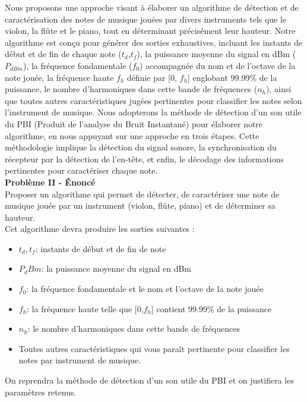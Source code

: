Nous proposons une approche visant à élaborer un algorithme de détection et de caractérisation des notes de musique jouées par divers instruments tels que le violon, la flûte et le piano, tout en déterminant précisément leur hauteur. Notre algorithme est conçu pour générer des sorties exhaustives, incluant les instants de début et de fin de chaque note ($t_d$,$t_f$), la puissance moyenne du signal en dBm ($P_{dBm}$), la fréquence fondamentale ($f_0$) accompagnée du nom et de l’octave de la note jouée, la fréquence haute $f_h$ définie par [0, $f_h$] englobant 99.99\% de la puissance, le nombre d’harmoniques dans cette bande de fréquences ($n_h$), ainsi que toutes autres caractéristiques jugées pertinentes pour classifier les notes selon l'instrument de musique. Nous adopterons la méthode de détection d’un son utile du PBI (Produit de l'analyse du Bruit Instantané) pour élaborer notre algorithme, en nous appuyant sur une approche en trois étapes. Cette méthodologie implique la détection du signal sonore, la synchronisation du récepteur par la détection de l'en-tête, et enfin, le décodage des informations pertinentes pour caractériser chaque note. 
\newline
\\
\textbf{Problème II - Énoncé } \  \\
Proposer un algorithme qui permet de détecter, de caractériser une note de musique jouée par un instrument (violon, flûte, piano) et de déterminer sa hauteur. \\
Cet algorithme devra produire les sorties suivantes : \\
\begin{itemize}
    \item $t_d, t_f$: instants de début et de fin de note
    \item $P_dBm$: la puissance moyenne du signal en dBm
    \item $f_0$: la fréquence fondamentale et le nom et l'octave de la note jouée
    \item $f_h$: la fréquence haute telle que [0,$f_h$] contient 99.99\% de la puissance
    \item $n_h$: le nombre d'harmoniques dans cette bande de fréquences
    \item Toutes autres caractéristiques qui vous paraît pertinente pour classifier les notes par instrument de musique.
\end{itemize}
 On reprendra la méthode de détection d'un son utile du PBI et on justifiera les paramètres retenus.
